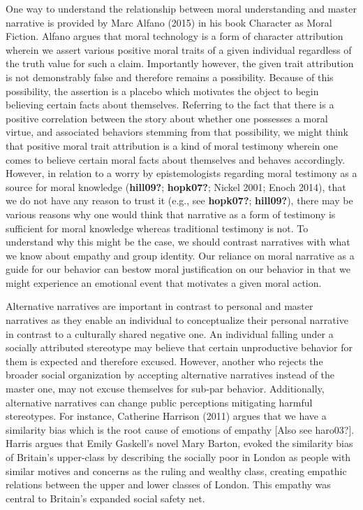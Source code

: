\documentclass[12pt]{book}
\theoremstyle{definition}
\theoremstyle{remark}
\begin{document}
One way to understand the relationship between moral understanding and master narrative is provided by Marc Alfano (2015) in his book Character as Moral Fiction. Alfano argues that moral technology is a form of character attribution wherein we assert various positive moral traits of a given individual regardless of the truth value for such a claim. Importantly however, the given trait attribution is not demonstrably false and therefore remains a possibility. Because of this possibility, the assertion is a placebo which motivates the object to begin believing certain facts about themselves. Referring to the fact that there is a positive correlation between the story about whether one possesses a moral virtue, and associated behaviors stemming from that possibility, we might think that positive moral trait attribution is a kind of moral testimony wherein one comes to believe certain moral facts about themselves and behaves accordingly. However, in relation to a worry by epistemologists regarding moral testimony as a source for moral knowledge (\textbf{hill09?}; \textbf{hopk07?}; Nickel 2001; Enoch 2014), that we do not have any reason to trust it (e.g., see \textbf{hopk07?}; \textbf{hill09?}), there may be various reasons why one would think that narrative as a form of testimony is sufficient for moral knowledge whereas traditional testimony is not. To understand why this might be the case, we should contrast narratives with what we know about empathy and group identity. Our reliance on moral narrative as a guide for our behavior can bestow moral justification on our behavior in that we might experience an emotional event that motivates a given moral action.

Alternative narratives are important in contrast to personal and master narratives as they enable an individual to conceptualize their personal narrative in contrast to a culturally shared negative one. An individual falling under a socially attributed stereotype may believe that certain unproductive behavior for them is expected and therefore excused. However, another who rejects the broader social organization by accepting alternative narratives instead of the master one, may not excuse themselves for sub-par behavior. Additionally, alternative narratives can change public perceptions mitigating harmful stereotypes. For instance, Catherine Harrison (2011) argues that we have a similarity bias which is the root cause of emotions of empathy {[}Also see haro03?{]}. Harris argues that Emily Gaskell's novel Mary Barton, evoked the similarity bias of Britain's upper-class by describing the socially poor in London as people with similar motives and concerns as the ruling and wealthy class, creating empathic relations between the upper and lower classes of London. This empathy was central to Britain's expanded social safety net.
\end{document}
